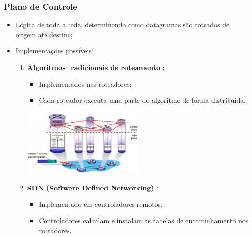         \subsubsection*{Plano de Controle}
            \begin{itemize}[left=0.5cm, align=left, nosep]
                \item Lógica de toda a rede, determinando como datagramas são roteados de origem até destino;
                \item Implementações possíveis:
                
                \begin{enumerate}[left=0.5cm, align=left, nosep]
                    
                    \item \textbf{Algoritmos tradicionais de roteamento :} 
                        \begin{itemize}[left=0.5cm, nosep, label=$\hookrightarrow$]
                            \item Implementados nos roteadores; 
                            \item Cada roteador executa uma parte do algoritmo de forma distribuída.
                        \end{itemize} 
                    
                    \begin{center}
                        \includegraphics[width=0.5\textwidth]{img/cap-04/algorimo-roteamento.png}
                    \end{center}
                    
                    \item \textbf{SDN (Software Defined Networking) :} 
                        \begin{itemize}[left=0.5cm, nosep, label=$\hookrightarrow$]
                            \item Implementado em controladores remotos; 
                            \item Controladores calculam e instalam as tabelas de encaminhamento nos roteadores.
                        \end{itemize} 
                         

\end{enumerate}
\end{itemize}
